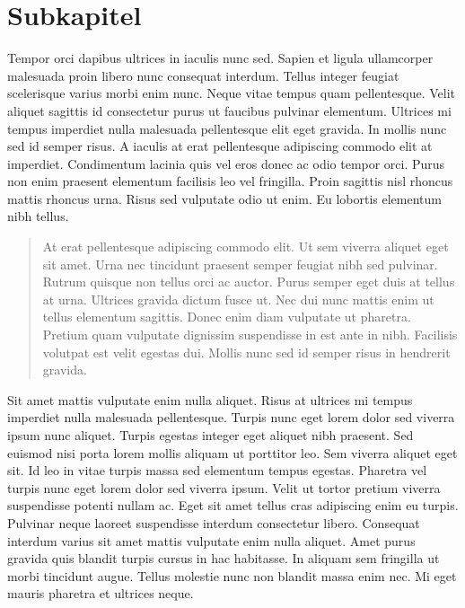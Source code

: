 \section{Subkapitel}
Tempor orci dapibus ultrices in iaculis nunc sed. Sapien et ligula ullamcorper malesuada proin libero nunc consequat interdum. Tellus integer feugiat scelerisque varius morbi enim nunc. Neque vitae tempus quam pellentesque. Velit aliquet sagittis id consectetur purus ut faucibus pulvinar elementum. Ultrices mi tempus imperdiet nulla malesuada pellentesque elit eget gravida. In mollis nunc sed id semper risus. A iaculis at erat pellentesque adipiscing commodo elit at imperdiet. Condimentum lacinia quis vel eros donec ac odio tempor orci. Purus non enim praesent elementum facilisis leo vel fringilla. Proin sagittis nisl rhoncus mattis rhoncus urna. Risus sed vulputate odio ut enim. Eu lobortis elementum nibh tellus.
\begin{quote}
    At erat pellentesque adipiscing commodo elit. Ut sem viverra aliquet eget sit amet. Urna nec tincidunt praesent semper feugiat nibh sed pulvinar. Rutrum quisque non tellus orci ac auctor. Purus semper eget duis at tellus at urna. Ultrices gravida dictum fusce ut. Nec dui nunc mattis enim ut tellus elementum sagittis. Donec enim diam vulputate ut pharetra. Pretium quam vulputate dignissim suspendisse in est ante in nibh. Facilisis volutpat est velit egestas dui. Mollis nunc sed id semper risus in hendrerit gravida.
\end{quote}
Sit amet mattis vulputate enim nulla aliquet. Risus at ultrices mi tempus imperdiet nulla malesuada pellentesque. Turpis nunc eget lorem dolor sed viverra ipsum nunc aliquet. Turpis egestas integer eget aliquet nibh praesent. Sed euismod nisi porta lorem mollis aliquam ut porttitor leo. Sem viverra aliquet eget sit. Id leo in vitae turpis massa sed elementum tempus egestas. Pharetra vel turpis nunc eget lorem dolor sed viverra ipsum. Velit ut tortor pretium viverra suspendisse potenti nullam ac. Eget sit amet tellus cras adipiscing enim eu turpis. Pulvinar neque laoreet suspendisse interdum consectetur libero. Consequat interdum varius sit amet mattis vulputate enim nulla aliquet. Amet purus gravida quis blandit turpis cursus in hac habitasse. In aliquam sem fringilla ut morbi tincidunt augue. Tellus molestie nunc non blandit massa enim nec. Mi eget mauris pharetra et ultrices neque.